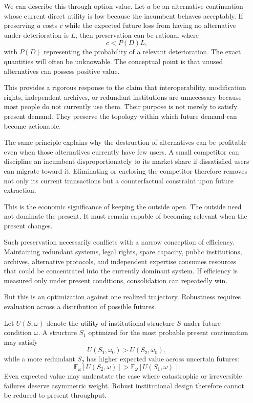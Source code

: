 \documentclass[11pt]{article}
\begin{document}
We can describe this through option value. Let \(a\) be an alternative continuation whose current direct utility is low because the incumbent behaves acceptably. If preserving \(a\) costs \(c\) while the expected future loss from having no alternative under deterioration is \(L\), then preservation can be rational where
\[
c < P(D)L,
\]
with \(P(D)\) representing the probability of a relevant deterioration. The exact quantities will often be unknowable. The conceptual point is that unused alternatives can possess positive value.

This provides a rigorous response to the claim that interoperability, modification rights, independent archives, or redundant institutions are unnecessary because most people do not currently use them. Their purpose is not merely to satisfy present demand. They preserve the topology within which future demand can become actionable.

The same principle explains why the destruction of alternatives can be profitable even when those alternatives currently have few users. A small competitor can discipline an incumbent disproportionately to its market share if dissatisfied users can migrate toward it. Eliminating or enclosing the competitor therefore removes not only its current transactions but a counterfactual constraint upon future extraction.

This is the economic significance of keeping the outside open. The outside need not dominate the present. It must remain capable of becoming relevant when the present changes.

Such preservation necessarily conflicts with a narrow conception of efficiency. Maintaining redundant systems, legal rights, spare capacity, public institutions, archives, alternative protocols, and independent expertise consumes resources that could be concentrated into the currently dominant system. If efficiency is measured only under present conditions, consolidation can repeatedly win.

But this is an optimization against one realized trajectory. Robustness requires evaluation across a distribution of possible futures.

Let \(U(S,\omega)\) denote the utility of institutional structure \(S\) under future condition \(\omega\). A structure \(S_1\) optimized for the most probable present continuation may satisfy
\[
U(S_1,\omega_0)>U(S_2,\omega_0),
\]
while a more redundant \(S_2\) has higher expected value across uncertain futures:
\[
\mathbb{E}_{\omega}[U(S_2,\omega)]
>
\mathbb{E}_{\omega}[U(S_1,\omega)].
\]
Even expected value may understate the case where catastrophic or irreversible failures deserve asymmetric weight. Robust institutional design therefore cannot be reduced to present throughput.
\end{document}
